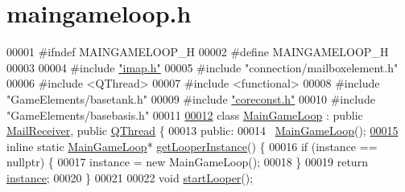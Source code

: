 \hypertarget{a00092_source}{}\section{maingameloop.\+h}
\label{a00092_source}

\begin{DoxyCode}
00001 \textcolor{preprocessor}{#}\textcolor{preprocessor}{ifndef} \textcolor{preprocessor}{MAINGAMELOOP\_H}
00002 \textcolor{preprocessor}{#}\textcolor{preprocessor}{define} \textcolor{preprocessor}{MAINGAMELOOP\_H}
00003 
00004 \textcolor{preprocessor}{#}\textcolor{preprocessor}{include} \hyperlink{a00053}{"imap.h"}
00005 \textcolor{preprocessor}{#}\textcolor{preprocessor}{include} \textcolor{preprocessor}{"connection/mailboxelement.h"}
00006 \textcolor{preprocessor}{#}\textcolor{preprocessor}{include} \textcolor{preprocessor}{<}\textcolor{preprocessor}{QThread}\textcolor{preprocessor}{>}
00007 \textcolor{preprocessor}{#}\textcolor{preprocessor}{include} \textcolor{preprocessor}{<}\textcolor{preprocessor}{functional}\textcolor{preprocessor}{>}
00008 \textcolor{preprocessor}{#}\textcolor{preprocessor}{include} \textcolor{preprocessor}{"GameElements/basetank.h"}
00009 \textcolor{preprocessor}{#}\textcolor{preprocessor}{include} \hyperlink{a00020}{"coreconst.h"}
00010 \textcolor{preprocessor}{#}\textcolor{preprocessor}{include} \textcolor{preprocessor}{"GameElements/basebasis.h"}
00011 
\hyperlink{a00209}{00012} \textcolor{keyword}{class} \hyperlink{a00209_ac4cd47d8b350ae45ea09aaecad11a684}{MainGameLoop} : \textcolor{keyword}{public} \hyperlink{a00197_ace6950e3788bb037f23ce8668ef83829}{MailReceiver}, \textcolor{keyword}{public} 
      \hyperlink{a00209_ac4cd47d8b350ae45ea09aaecad11a684}{QThread} \{
00013  \textcolor{keyword}{public}:
00014   ~\hyperlink{a00209_aeeabdbe46a5aeb891d7da7fd9430d0cb}{MainGameLoop}();
\hyperlink{a00209_ae4df98e12ba90efd73b144455d9fd52d}{00015}   \textcolor{keyword}{inline} \textcolor{keyword}{static} \hyperlink{a00209_ac4cd47d8b350ae45ea09aaecad11a684}{MainGameLoop}* \hyperlink{a00209_ae4df98e12ba90efd73b144455d9fd52d}{getLooperInstance}() \{
00016     \textcolor{keywordflow}{if} (instance == nullptr) \{
00017       instance = \textcolor{keyword}{new} MainGameLoop();
00018     \}
00019     \textcolor{keywordflow}{return} \hyperlink{a00209_a2578ca393ef9030407e5b3ac17b9f6ab}{instance};
00020   \}
00021 
00022   \textcolor{keywordtype}{void} \hyperlink{a00209_a2329f4e9c9a4ad9ecbed39d5c297245f}{startLooper}();

\end{DoxyCode}

